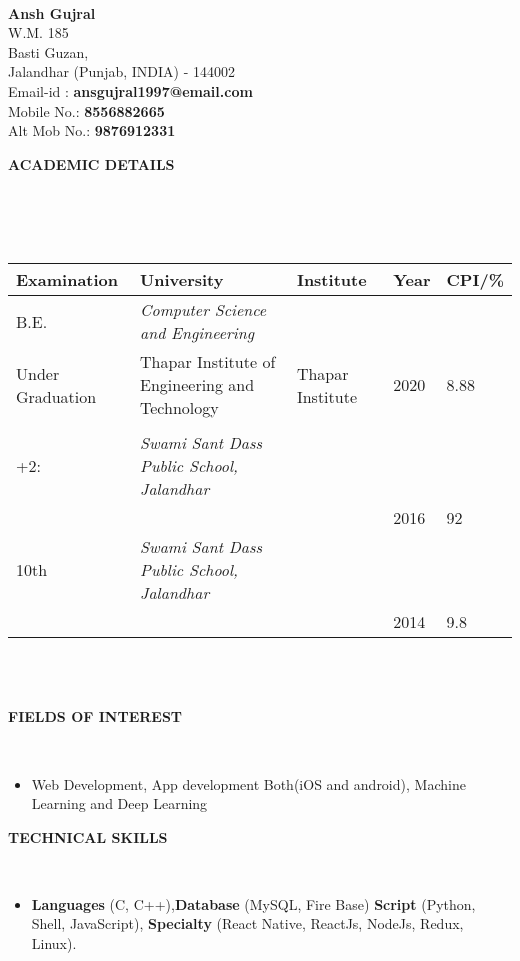 \documentclass[a4paper,10pt]{article}
\newcommand{\lsep}{-0.5cm}
\newcommand{\resheading}[1]{{\small \colorbox{mygrey}{\begin{minipage}{0.975\textwidth}{\textbf{#1 \vphantom{p\^{E}}}}\end{minipage}}}}
\begin{document}
\hspace{0.5cm}\\[-0.2cm]

\textbf{Ansh Gujral} \\
\indent W.M. 185 \\
\indent Basti Guzan,  \\
\indent Jalandhar (Punjab, INDIA) - 144002\\
\indent Email-id : \textbf{ansgujral1997@email.com} \\
\indent Mobile No.: \textbf{8556882665} \\
\indent Alt Mob No.: \textbf{9876912331} \\

\resheading{\textbf{ACADEMIC DETAILS} }\\[\lsep]
\\ \\
\indent \begin{tabular}{ l @{\hskip 0.15in} l @{\hskip 0.15in} l @{\hskip 0.15in} l @{\hskip 0.15in} l }
\hline
\textbf{Examination} & \textbf{University} & \textbf{Institute} & \textbf{Year} & \textbf{CPI/\%} \\
\hline
B.E.\,\, & \textit{Computer Science and Engineering} \\
Under Graduation & Thapar Institute of Engineering and Technology & Thapar Institute & 2020 & 8.88 \\ \\
+2: & \textit{Swami Sant Dass Public School, Jalandhar} \\
 &  &  & 2016 & 92\\
10th\,\, & \textit{Swami Sant Dass Public School, Jalandhar} \\
 &  &  & 2014 & 9.8 \\
\end{tabular}
\\ \\

\resheading{\textbf{FIELDS OF INTEREST} }\\[\lsep]
\begin{itemize}
\item \noindent Web Development, App development Both(iOS and android), Machine Learning and Deep Learning
\end{itemize}

\resheading{\textbf{TECHNICAL SKILLS} }\\[\lsep]
\begin{itemize}
\item \noindent \textbf{Languages} (C, C++),\textbf{Database} (MySQL, Fire Base) \textbf{Script} (Python, Shell, JavaScript), \textbf{Specialty} (React Native, ReactJs, NodeJs, Redux, Linux).
\end{itemize}
\end{document}
